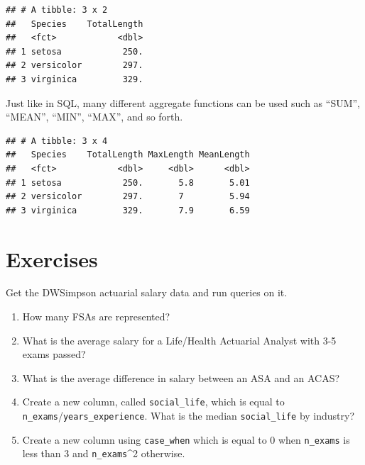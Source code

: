 \documentclass[]{book}
\newenvironment{Shaded}{\begin{snugshade}}{\end{snugshade}}
\newcommand{\DataTypeTok}[1]{\textcolor[rgb]{0.13,0.29,0.53}{#1}}
\newcommand{\KeywordTok}[1]{\textcolor[rgb]{0.13,0.29,0.53}{\textbf{#1}}}
\newcommand{\NormalTok}[1]{#1}
\newcommand{\OperatorTok}[1]{\textcolor[rgb]{0.81,0.36,0.00}{\textbf{#1}}}
\newcommand{\StringTok}[1]{\textcolor[rgb]{0.31,0.60,0.02}{#1}}
\begin{document}
\begin{verbatim}
## # A tibble: 3 x 2
##   Species    TotalLength
##   <fct>            <dbl>
## 1 setosa            250.
## 2 versicolor        297.
## 3 virginica         329.
\end{verbatim}

Just like in SQL, many different aggregate functions can be used such as ``SUM'', ``MEAN'', ``MIN'', ``MAX'', and so forth.

\begin{Shaded}
\end{Shaded}

\begin{verbatim}
## # A tibble: 3 x 4
##   Species    TotalLength MaxLength MeanLength
##   <fct>            <dbl>     <dbl>      <dbl>
## 1 setosa            250.       5.8       5.01
## 2 versicolor        297.       7         5.94
## 3 virginica         329.       7.9       6.59
\end{verbatim}

\hypertarget{exercises}{%
\section{Exercises}\label{exercises}}

Get the DWSimpson actuarial salary data and run queries on it.

\begin{enumerate}
\def\labelenumi{\arabic{enumi}.}
\item
  How many FSAs are represented?
\item
  What is the average salary for a Life/Health Actuarial Analyst with 3-5 exams passed?
\item
  What is the average difference in salary between an ASA and an ACAS?
\item
  Create a new column, called \texttt{social\_life}, which is equal to \texttt{n\_exams}/\texttt{years\_experience}. What is the median \texttt{social\_life} by industry?
\item
  Create a new column using \texttt{case\_when} which is equal to 0 when \texttt{n\_exams} is less than 3 and \texttt{n\_exams}\^{}2 otherwise.
\end{enumerate}
\end{document}
